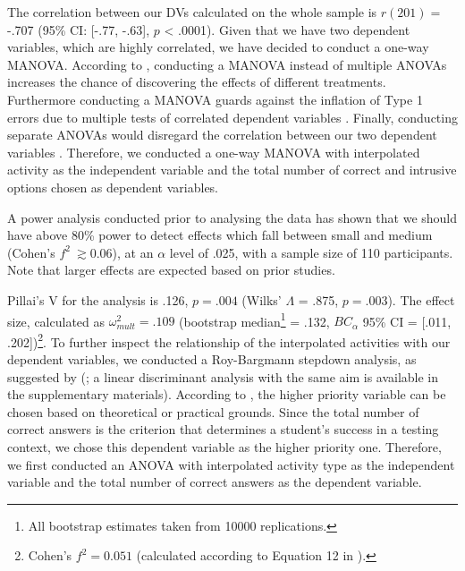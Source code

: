 The correlation between our DVs calculated on the whole sample is
\(r(201) =\) -.707 (95\% CI: {[}-.77, -.63{]}, \(p\) \textless{} .0001).
Given that we have two dependent variables, which are highly correlated,
we have decided to conduct a one-way MANOVA. According to
\citet{tabachnickUsingMultivariateStatistics2012}, conducting a MANOVA
instead of multiple ANOVAs increases the chance of discovering the
effects of different treatments. Furthermore conducting a MANOVA guards
against the inflation of Type 1 errors due to multiple tests of
correlated dependent variables
\citep{tabachnickUsingMultivariateStatistics2012,fieldDiscoveringStatisticsUsing2012}.
Finally, conducting separate ANOVAs would disregard the correlation
between our two dependent variables
\citep{fieldDiscoveringStatisticsUsing2012}. Therefore, we conducted a
one-way MANOVA with interpolated activity as the independent variable
and the total number of correct and intrusive options chosen as
dependent variables.

A power analysis conducted prior to analysing the data
\citep[using the G*Power software by][]{faulStatisticalPowerAnalyses2009}
has shown that we should have above 80\% power to detect effects which
fall between small and medium (Cohen's \(f^2\ \gtrsim 0.06\)), at an
\(\alpha\) level of .025, with a sample size of 110 participants. Note
that larger effects are expected based on prior studies.

Pillai's V for the analysis is .126, \(p = .004\) (Wilks' \(\Lambda\) =
.875, \(p = .003\)). The effect size, calculated as
\(\omega^2_{mult} = .109\) (bootstrap
median\footnote{All bootstrap estimates taken from 10000 replications.}
= .132, \(BC_\alpha\) 95\% CI = {[}.011, .202{]})\footnote{
Cohen's \(f^2 = 0.051\) (calculated according to Equation 12 in
\citealp{steynjrEstimatingEffectSize2009}).
}. To further inspect the relationship of the interpolated activities
with our dependent variables, we conducted a Roy-Bargmann stepdown
analysis, as suggested by
\citeauthor{tabachnickUsingMultivariateStatistics2012}
(\citeyear{tabachnickUsingMultivariateStatistics2012}; a linear
discriminant analysis with the same aim is available in the
supplementary materials). According to
\citet{tabachnickUsingMultivariateStatistics2012}, the higher priority
variable can be chosen based on theoretical or practical grounds. Since
the total number of correct answers is the criterion that determines a
student's success in a testing context, we chose this dependent variable
as the higher priority one. Therefore, we first conducted an ANOVA with
interpolated activity type as the independent variable and the total
number of correct answers as the dependent variable.

